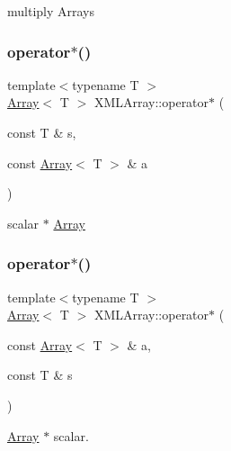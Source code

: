 multiply Arrays 

\mbox{\label{namespaceXMLArray_aaa1966396ac690ebef94472a82eb3aff}} 
\subsubsection{\texorpdfstring{operator$\ast$()}{operator*()}\hspace{0.1cm}{\footnotesize\ttfamily [4/5]}}
{\footnotesize\ttfamily template$<$typename T $>$ \\
\mbox{\hyperlink{classXMLArray_1_1Array}{Array}}$<$ T $>$ X\+M\+L\+Array\+::operator$\ast$ (\begin{DoxyParamCaption}\item[{const T \&}]{s,  }\item[{const \mbox{\hyperlink{classXMLArray_1_1Array}{Array}}$<$ T $>$ \&}]{a }\end{DoxyParamCaption})\hspace{0.3cm}{\ttfamily [inline]}}



scalar $\ast$ \mbox{\hyperlink{classXMLArray_1_1Array}{Array}} 

\mbox{\label{namespaceXMLArray_afa646c57d753c6caf977c840d370394e}} 
\subsubsection{\texorpdfstring{operator$\ast$()}{operator*()}\hspace{0.1cm}{\footnotesize\ttfamily [5/5]}}
{\footnotesize\ttfamily template$<$typename T $>$ \\
\mbox{\hyperlink{classXMLArray_1_1Array}{Array}}$<$ T $>$ X\+M\+L\+Array\+::operator$\ast$ (\begin{DoxyParamCaption}\item[{const \mbox{\hyperlink{classXMLArray_1_1Array}{Array}}$<$ T $>$ \&}]{a,  }\item[{const T \&}]{s }\end{DoxyParamCaption})\hspace{0.3cm}{\ttfamily [inline]}}



\mbox{\hyperlink{classXMLArray_1_1Array}{Array}} $\ast$ scalar. 

